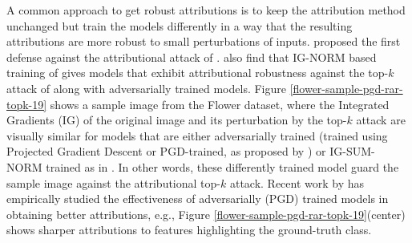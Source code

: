 \documentclass[letterpaper]{article} %
\begin{document}
%
%
%
%
A common approach to get robust attributions is to keep the attribution method unchanged but train the models differently in a way that the resulting attributions are more robust to small perturbations of inputs. \citet{chen2019robust} proposed the first defense against the attributional attack of \citet{ghorbani2018interpretation}. \citet{wang2020smoothed} also find that IG-NORM based training of \citet{chen2019robust} gives models that exhibit attributional robustness against the top-$k$ attack of \citet{ghorbani2018interpretation} along with adversarially trained models. Figure \ref{flower-sample-pgd-rar-topk-19} shows a sample image from the Flower dataset, where the Integrated Gradients (IG) of the original image and its perturbation by the top-$k$ attack are visually similar for models that are either adversarially trained (trained using Projected Gradient Descent or PGD-trained, as proposed by \citep{madry2019deep}) or IG-SUM-NORM trained as in \citet{chen2019robust}. In other words, these differently trained model guard the sample image against the attributional top-$k$ attack. Recent work by \citet{nourelahi2022} has empirically studied the effectiveness of adversarially (PGD) trained models in obtaining better attributions, e.g., Figure \ref{flower-sample-pgd-rar-topk-19}(center) shows sharper attributions to features highlighting the ground-truth class.
\end{document}

